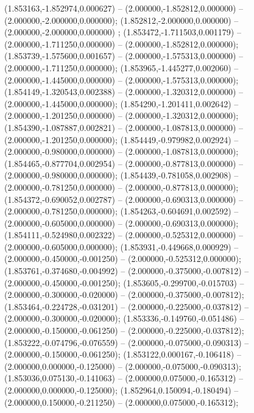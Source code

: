  (1.853163,-1.852974,0.000627) -- (2.000000,-1.852812,0.000000) -- (2.000000,-2.000000,0.000000);
 (1.852812,-2.000000,0.000000) -- (2.000000,-2.000000,0.000000) ;
 (1.853472,-1.711503,0.001179) -- (2.000000,-1.711250,0.000000) -- (2.000000,-1.852812,0.000000);
 (1.853739,-1.575600,0.001657) -- (2.000000,-1.575313,0.000000) -- (2.000000,-1.711250,0.000000);
 (1.853965,-1.445277,0.002060) -- (2.000000,-1.445000,0.000000) -- (2.000000,-1.575313,0.000000);
 (1.854149,-1.320543,0.002388) -- (2.000000,-1.320312,0.000000) -- (2.000000,-1.445000,0.000000);
 (1.854290,-1.201411,0.002642) -- (2.000000,-1.201250,0.000000) -- (2.000000,-1.320312,0.000000);
 (1.854390,-1.087887,0.002821) -- (2.000000,-1.087813,0.000000) -- (2.000000,-1.201250,0.000000);
 (1.854449,-0.979982,0.002924) -- (2.000000,-0.980000,0.000000) -- (2.000000,-1.087813,0.000000);
 (1.854465,-0.877704,0.002954) -- (2.000000,-0.877813,0.000000) -- (2.000000,-0.980000,0.000000);
 (1.854439,-0.781058,0.002908) -- (2.000000,-0.781250,0.000000) -- (2.000000,-0.877813,0.000000);
 (1.854372,-0.690052,0.002787) -- (2.000000,-0.690313,0.000000) -- (2.000000,-0.781250,0.000000);
 (1.854263,-0.604691,0.002592) -- (2.000000,-0.605000,0.000000) -- (2.000000,-0.690313,0.000000);
 (1.854111,-0.524980,0.002322) -- (2.000000,-0.525312,0.000000) -- (2.000000,-0.605000,0.000000);
 (1.853931,-0.449668,0.000929) -- (2.000000,-0.450000,-0.001250) -- (2.000000,-0.525312,0.000000);
 (1.853761,-0.374680,-0.004992) -- (2.000000,-0.375000,-0.007812) -- (2.000000,-0.450000,-0.001250);
 (1.853605,-0.299700,-0.015703) -- (2.000000,-0.300000,-0.020000) -- (2.000000,-0.375000,-0.007812);
 (1.853464,-0.224728,-0.031201) -- (2.000000,-0.225000,-0.037812) -- (2.000000,-0.300000,-0.020000);
 (1.853336,-0.149760,-0.051486) -- (2.000000,-0.150000,-0.061250) -- (2.000000,-0.225000,-0.037812);
 (1.853222,-0.074796,-0.076559) -- (2.000000,-0.075000,-0.090313) -- (2.000000,-0.150000,-0.061250);
 (1.853122,0.000167,-0.106418) -- (2.000000,0.000000,-0.125000) -- (2.000000,-0.075000,-0.090313);
 (1.853036,0.075130,-0.141063) -- (2.000000,0.075000,-0.165312) -- (2.000000,0.000000,-0.125000);
 (1.852964,0.150094,-0.180494) -- (2.000000,0.150000,-0.211250) -- (2.000000,0.075000,-0.165312);
